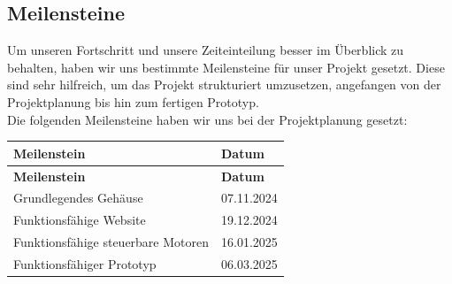 \documentclass[ngerman,12pt,a4paper]{article}
\begin{document}
		\subsection{Meilensteine} %
		Um unseren Fortschritt und unsere Zeiteinteilung besser im Überblick zu behalten, haben wir uns bestimmte Meilensteine für unser Projekt gesetzt. Diese sind sehr hilfreich, um das Projekt strukturiert umzusetzen, angefangen von der Projektplanung bis hin zum fertigen Prototyp. \\[0.5cm]
		Die folgenden Meilensteine haben wir uns bei der Projektplanung gesetzt:
		\begin{longtable}{| l | l |}
			\hline
			\textbf{Meilenstein} & \textbf{Datum} \\
			\hline
			\endfirsthead
			\hline
			\textbf{Meilenstein} & \textbf{Datum} \\
			\hline
			\endhead
			\hline
			Grundlegendes Gehäuse & 07.11.2024 \\
			\hline
			Funktionsfähige Website & 19.12.2024 \\
			\hline
			Funktionsfähige steuerbare Motoren & 16.01.2025 \\
			\hline
			Funktionsfähiger Prototyp & 06.03.2025 \\
			\hline
		\end{longtable}
\end{document}
